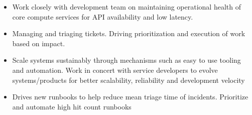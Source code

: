 \documentclass[10pt,a4paper,ragged2e]{altacv}
\begin{document}

\begin{fullwidth}
\makecvheader
\end{fullwidth}



\begin{itemize}
\item Work closely with development team on maintaining operational health of core compute services for API availability and low latency.
\smallskip
\item Managing and triaging tickets. Driving prioritization and execution of work based on impact.
\smallskip
\item Scale systems sustainably through mechanisms such as easy to use tooling and automation. Work in concert with service developers to evolve systems/products for better scalability, reliability and development velocity
\smallskip
\item Drives new runbooks to help reduce mean triage time of incidents. Prioritize and automate high hit count runbooks
\end{itemize}
\end{document}
